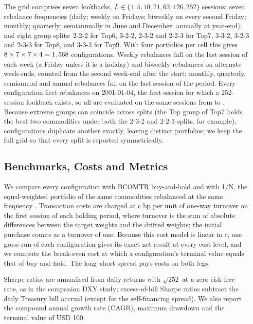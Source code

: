 \documentclass[commodities,article,submit,pdftex,moreauthors]{Definitions/mdpi}
\begin{document}
The grid comprises seven lookbacks, $L \in \{1, 5, 10, 21, 63, 126, 252\}$ sessions; seven rebalance frequencies (daily; weekly on Fridays; biweekly on every second Friday; monthly; quarterly; semiannually in June and December; annually at year-end); and eight group splits: 2-2-2 for Top6, 3-2-2, 2-3-2 and 2-2-3 for Top7, 3-3-2, 3-2-3 and 2-3-3 for Top8, and 3-3-3 for Top9. With four portfolios per cell this gives $8 \times 7 \times 7 \times 4 = 1,568$ configurations. Weekly rebalances fall on the last session of each week (a Friday unless it is a holiday) and biweekly rebalances on alternate week-ends, counted from the second week-end after the start; monthly, quarterly, semiannual and annual rebalances fall on the last session of the period. Every configuration first rebalances on 2001-01-04, the first session for which a 252-session lookback exists, so all are evaluated on the same \evalSessions{} sessions from \evalStart{} to \evalEnd. Because extreme groups can coincide across splits (the Top group of Top7 holds the best two commodities under both the 2-3-2 and 2-2-3 splits, for example), \nDup{} configurations duplicate another exactly, leaving \nDistinct{} distinct portfolios; we keep the full grid so that every split is reported symmetrically.

\subsection{Benchmarks, Costs and Metrics}

We compare every configuration with BCOMTR buy-and-hold and with 1/N, the equal-weighted portfolio of the same commodities rebalanced at the same frequency \citep{demiguel2009}. Transaction costs are charged at $c$ bp per unit of one-way turnover on the first session of each holding period, where turnover is the sum of absolute differences between the target weights and the drifted weights; the initial purchase counts as a turnover of one. Because this cost model is linear in $c$, one gross run of each configuration gives its exact net result at every cost level, and we compute the break-even cost at which a configuration's terminal value equals that of buy-and-hold. The long--short spread pays costs on both legs.

Sharpe ratios are annualised from daily returns with $\sqrt{252}$ at a zero risk-free rate, as in the companion DXY study; excess-of-bill Sharpe ratios subtract the daily Treasury bill accrual (except for the self-financing spread). We also report the compound annual growth rate (CAGR), maximum drawdown and the terminal value of USD 100.
\end{document}
